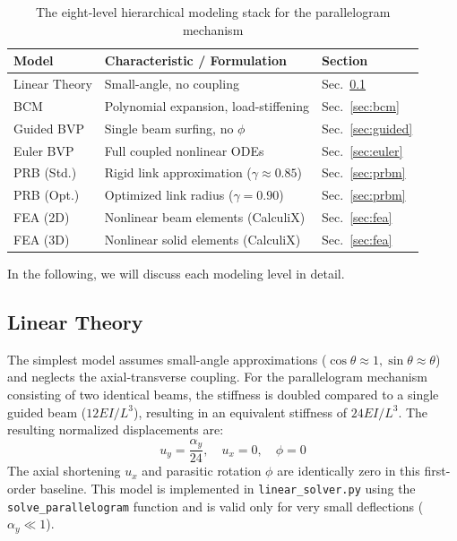 \documentclass[colorlinks,upint,subscriptcorrection,varvw,hyphenate,balance]{asmeconf} %
\begin{document}
\begin{table}[ht]
\centering
\caption{The eight-level hierarchical modeling stack for the parallelogram mechanism}
\label{tab:modeling_stack}
\begin{tabular}{lll}
\toprule
\textbf{Model} & \textbf{Characteristic / Formulation} & \textbf{Section} \\
\midrule
Linear Theory & Small-angle, no coupling & Sec.~\ref{sec:linear} \\
BCM \cite{awtar2007characteristics} & Polynomial expansion, load-stiffening & Sec.~\ref{sec:bcm} \\
Guided BVP & Single beam surfing, no $\phi$ & Sec.~\ref{sec:guided} \\
Euler BVP & Full coupled nonlinear ODEs & Sec.~\ref{sec:euler} \\
PRB (Std.) & Rigid link approximation ($\gamma \approx 0.85$) & Sec.~\ref{sec:prbm} \\
PRB (Opt.) & Optimized link radius ($\gamma = 0.90$) & Sec.~\ref{sec:prbm} \\
FEA (2D) & Nonlinear beam elements (CalculiX) & Sec.~\ref{sec:fea} \\
FEA (3D) & Nonlinear solid elements (CalculiX) & Sec.~\ref{sec:fea} \\
\bottomrule
\end{tabular}
\end{table}

In the following, we will discuss each modeling level in detail.

\subsection{Linear Theory}
\label{sec:linear}
The simplest model assumes small-angle approximations ($\cos\theta \approx 1, \sin\theta \approx \theta$) and neglects the axial-transverse coupling. For the parallelogram mechanism consisting of two identical beams, the stiffness is doubled compared to a single guided beam ($12EI/L^3$), resulting in an equivalent stiffness of $24EI/L^3$. The resulting normalized displacements are:
\begin{equation}
u_y = \frac{\alpha_y}{24}, \quad u_x = 0, \quad \phi = 0 
\end{equation}
The axial shortening $u_x$ and parasitic rotation $\phi$ are identically zero in this first-order baseline. This model is implemented in \texttt{linear\_solver.py} using the \texttt{solve\_parallelogram} function and is valid only for very small deflections ($\alpha_y \ll 1$).
\end{document}
